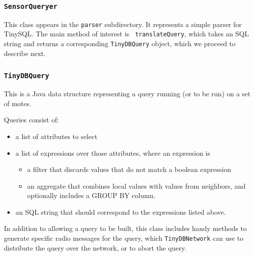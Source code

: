 \documentclass[11pt]{article}
\begin{document}
\subsubsection{\tt SensorQueryer}
This class appears in the {\tt parser} subdirectory.  It represents a
simple parser for TinySQL.  The main method of interest is {\tt
translateQuery}, which takes an SQL string and returns a corresponding
{\tt TinyDBQuery} object, which we proceed to describe next.

\subsubsection{\tt TinyDBQuery} 
\label{sec:tinydbquery}
This is a Java data structure representing a
    query running (or to be run) on a set of motes.
    
    Queries consist of:
    \begin{itemize}
    \item a list of attributes to select
    \item a list of expressions over those attributes, where an expression
    is
      \begin{itemize}
      \item a filter that discards values that do not match a
      boolean expression
      \item an aggregate that combines local values
        with values from
        neighbors, and optionally includes a GROUP
        BY column.  
      \end{itemize}
    \item an SQL string that should correspond to the expressions
    listed above.

    \end{itemize}

   In addition to allowing a query to be built, this class includes
   handy methods to generate specific radio messages for the query,
   which {\tt TinyDBNetwork} can use to distribute the query over the
   network, or to abort the query.
\end{document}
